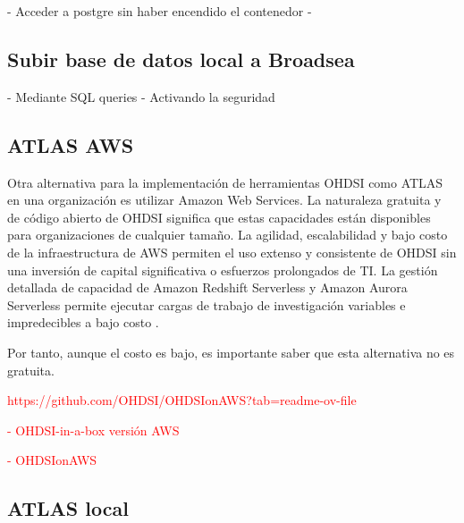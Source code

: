 \documentclass{article}
\begin{document}
- Acceder a postgre sin haber encendido el contenedor
- 

\subsection{Subir base de datos local a Broadsea}


- Mediante SQL queries
- Activando la seguridad










\newpage
\subsection{ATLAS AWS}\label{cap:AtlasAWS}

Otra alternativa para la implementación de herramientas OHDSI como ATLAS en una organización es utilizar Amazon Web Services. La naturaleza gratuita y de código abierto de OHDSI significa que estas capacidades están disponibles para organizaciones de cualquier tamaño. La agilidad, escalabilidad y bajo costo de la infraestructura de AWS permiten el uso extenso y consistente de OHDSI sin una inversión de capital significativa o esfuerzos prolongados de TI. La gestión detallada de capacidad de Amazon Redshift Serverless y Amazon Aurora Serverless permite ejecutar cargas de trabajo de investigación variables e impredecibles a bajo costo \cite{OHDSIAWS}. 

Por tanto, aunque el costo es bajo, es importante saber que esta alternativa no es gratuita.


\textcolor{red}{https://github.com/OHDSI/OHDSIonAWS?tab=readme-ov-file}

\textcolor{red}{- OHDSI-in-a-box versión AWS}

\textcolor{red}{- OHDSIonAWS}


\subsection{ATLAS local} \label{cap:ATLASlocal}
\end{document}
